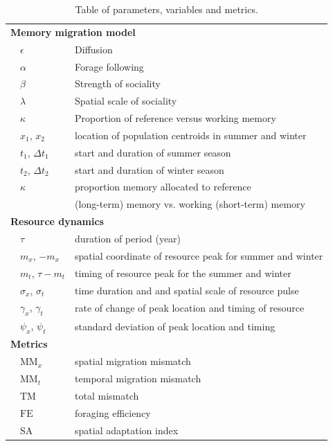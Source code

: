 \documentclass[utf8]{frontiersSCNS} %
\begin{document}
	\begin{table}[b!]
		\caption{\label{table_definitions} Table of parameters, variables and metrics.}
		
		\centering
		\begin{tabular}{ll|l}
			\hline\hline
			\multicolumn{3}{l}{\textbf{Memory migration model}}\\ 
			& $\epsilon$ & Diffusion \\ 
			& $\alpha$ & Forage following \\ 
			& $\beta$ & Strength of sociality \\ 
			& $\lambda$ & Spatial scale of sociality \\ 
			& $\kappa$ & Proportion of reference versus working memory \\ 
			& $x_1$, $x_2$ & location of population centroids in summer and winter \\ 
			& $t_1$, $\Delta t_1$ & start and duration of summer season \\ 
			& $t_2$, $\Delta t_2$ & start and duration of winter season \\ 
			& $\kappa$ & proportion memory allocated to reference \\
			&& (long-term) memory vs. working (short-term) memory \\ 
			\multicolumn{3}{l}{\textbf{Resource dynamics}} \\ 
			& $\tau$ & duration of period (year) \\ 
			& $m_x$, $-m_x$ & spatial coordinate of resource peak for summer and winter \\ 
			& $m_t$, $\tau - m_t$ & timing of resource peak for the summer and winter \\ 
			& $\sigma_x$, $\sigma_t$ & time duration and and spatial scale of resource pulse \\ 
			& $\gamma_x$, $\gamma_t$ & rate of change of peak location and timing of resource \\ 
			& $\psi_x$, $\psi_t$ & standard deviation of peak location and timing \\ 
			\multicolumn{3}{l}{\textbf{Metrics}}\\ 
			& $\text{MM}_x$ & spatial migration mismatch \\ 
			& $\text{MM}_t$ & temporal migration mismatch \\ 
			& $\text{TM}$ & total mismatch \\ 
			& $\text{FE}$ & foraging efficiency \\ 
			& $\text{SA}$ & spatial adaptation index \\ 
			\hline\hline
		\end{tabular}
	\end{table}
	
\end{document}
